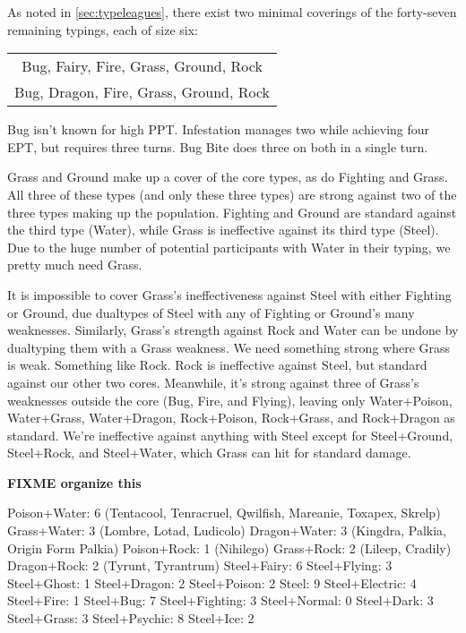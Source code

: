 As noted in \autoref{sec:typeleagues}, there exist two minimal coverings of the forty-seven
  remaining typings, each of size six:
\begin{center}
\begin{tabular}{c}
 Bug, Fairy, Fire, Grass, Ground, Rock\\
 Bug, Dragon, Fire, Grass, Ground, Rock\\
\end{tabular}
\end{center}
Bug isn't known for high PPT\@. Infestation manages two while achieving four EPT,
 but requires three turns. Bug Bite does three on both in a single turn.

Grass and Ground make up a cover of the core types, as do Fighting and Grass.
All three of these types (and only these three types) are strong against two of the three
  types making up the population.
Fighting and Ground are standard against the third type (Water), while Grass is ineffective
  against its third type (Steel).
Due to the huge number of potential participants with Water in their typing, we pretty
  much need Grass.

It is impossible to cover Grass's ineffectiveness against Steel with either Fighting or Ground,
  due dualtypes of Steel with any of Fighting or Ground's many weaknesses.
Similarly, Grass's strength against Rock and Water can be undone by dualtyping them with a Grass weakness.
We need something strong where Grass is weak.
Something like Rock.
Rock is ineffective against Steel, but standard against our other two cores.
Meanwhile, it's strong against three of Grass's weaknesses outside the core (Bug, Fire, and Flying),
  leaving only Water+Poison, Water+Grass, Water+Dragon, Rock+Poison, Rock+Grass, and Rock+Dragon
  as standard.
We're ineffective against anything with Steel except for Steel+Ground, Steel+Rock, and Steel+Water, which
  Grass can hit for standard damage.

  \textbf{FIXME organize this}

  Poison+Water: 6 (Tentacool, Tenracruel, Qwilfish, Mareanie, Toxapex, Skrelp)
  Grass+Water: 3 (Lombre, Lotad, Ludicolo)
  Dragon+Water: 3 (Kingdra, Palkia, Origin Form Palkia)
  Poison+Rock: 1 (Nihilego)
  Grass+Rock: 2 (Lileep, Cradily)
  Dragon+Rock: 2 (Tyrunt, Tyrantrum)
  Steel+Fairy: 6
  Steel+Flying: 3
  Steel+Ghost: 1
  Steel+Dragon: 2
  Steel+Poison: 2
  Steel: 9
  Steel+Electric: 4
  Steel+Fire: 1
  Steel+Bug: 7
  Steel+Fighting: 3
  Steel+Normal: 0
  Steel+Dark: 3
  Steel+Grass: 3
  Steel+Psychic: 8
  Steel+Ice: 2

